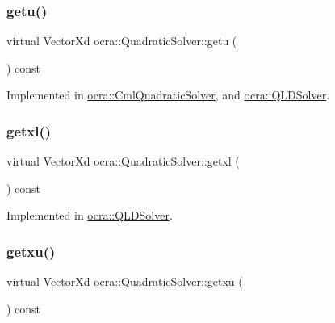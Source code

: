 \hypertarget{classocra_1_1QuadraticSolver_a6d5040842f155042064a33939aa60385}{}\label{classocra_1_1QuadraticSolver_a6d5040842f155042064a33939aa60385} 
\subsubsection{\texorpdfstring{getu()}{getu()}}
{\footnotesize\ttfamily virtual Vector\+Xd ocra\+::\+Quadratic\+Solver\+::getu (\begin{DoxyParamCaption}{ }\end{DoxyParamCaption}) const\hspace{0.3cm}{\ttfamily [pure virtual]}}



Implemented in \hyperlink{classocra_1_1CmlQuadraticSolver_af674cde45f84730e2447d0e34a6e6918}{ocra\+::\+Cml\+Quadratic\+Solver}, and \hyperlink{classocra_1_1QLDSolver_a643f978628ee45f88940ddbd7822aedd}{ocra\+::\+Q\+L\+D\+Solver}.

\hypertarget{classocra_1_1QuadraticSolver_a9c8270a0e1a921641884586ff448392b}{}\label{classocra_1_1QuadraticSolver_a9c8270a0e1a921641884586ff448392b} 
\subsubsection{\texorpdfstring{getxl()}{getxl()}}
{\footnotesize\ttfamily virtual Vector\+Xd ocra\+::\+Quadratic\+Solver\+::getxl (\begin{DoxyParamCaption}{ }\end{DoxyParamCaption}) const\hspace{0.3cm}{\ttfamily [pure virtual]}}



Implemented in \hyperlink{classocra_1_1QLDSolver_ab0ad9b36f9a063b0fb59d48e447a1449}{ocra\+::\+Q\+L\+D\+Solver}.

\hypertarget{classocra_1_1QuadraticSolver_a58cb3039938bc2a6c9c0e1042425a98b}{}\label{classocra_1_1QuadraticSolver_a58cb3039938bc2a6c9c0e1042425a98b} 
\subsubsection{\texorpdfstring{getxu()}{getxu()}}
{\footnotesize\ttfamily virtual Vector\+Xd ocra\+::\+Quadratic\+Solver\+::getxu (\begin{DoxyParamCaption}{ }\end{DoxyParamCaption}) const\hspace{0.3cm}{\ttfamily [pure virtual]}}



